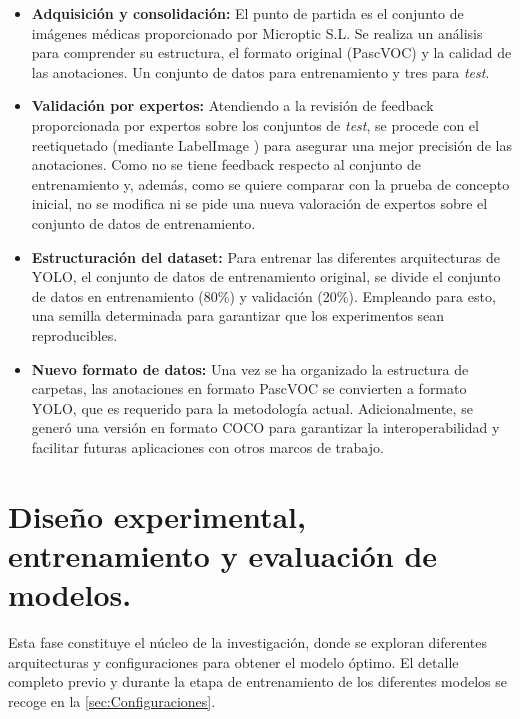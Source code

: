\documentclass[12pt,a4paper,onecolumn,oneside]{report}
\begin{document}
\begin{itemize}
  \item \textbf{Adquisición y consolidación:} El punto de partida es el conjunto de imágenes médicas proporcionado por Microptic S.L. \cite{microptic} 
  Se realiza un análisis para comprender su estructura, el formato original (PascVOC) y la calidad de las anotaciones. Un conjunto de datos para entrenamiento y tres para \textit{test}.
  \item \textbf{Validación por expertos:} Atendiendo a la revisión de feedback proporcionada por expertos sobre los conjuntos de \textit{test}, se procede con el reetiquetado (mediante LabelImage \cite{labelimg_github}) para asegurar una mejor precisión de las anotaciones. 
  Como no se tiene feedback respecto al conjunto de entrenamiento y, además, como se quiere comparar con la prueba de concepto inicial, no se modifica ni se pide una nueva valoración de expertos sobre el conjunto de datos de entrenamiento.
  \item \textbf{Estructuración del dataset:} Para entrenar las diferentes arquitecturas de YOLO, el conjunto de datos de entrenamiento original, se divide el conjunto de datos en entrenamiento (80\%) y validación (20\%). Empleando para esto, una semilla determinada para garantizar que los experimentos sean reproducibles. 
  \item \textbf{Nuevo formato de datos:} Una vez se ha organizado la estructura de carpetas, las anotaciones en formato PascVOC se convierten a formato YOLO, que es requerido para la metodología actual. Adicionalmente, se generó una versión en formato COCO para garantizar la interoperabilidad y facilitar futuras aplicaciones con otros marcos de trabajo.
\end{itemize}

\section{Diseño experimental, entrenamiento y evaluación de modelos.}
\label{Entrenamiento, validación y evaluación de modelos YOLO}

Esta fase constituye el núcleo de la investigación, donde se exploran diferentes arquitecturas y configuraciones para obtener el modelo óptimo.
El detalle completo previo y durante la etapa de entrenamiento de los diferentes modelos se recoge en la \autoref{sec:Configuraciones}.
\end{document}
